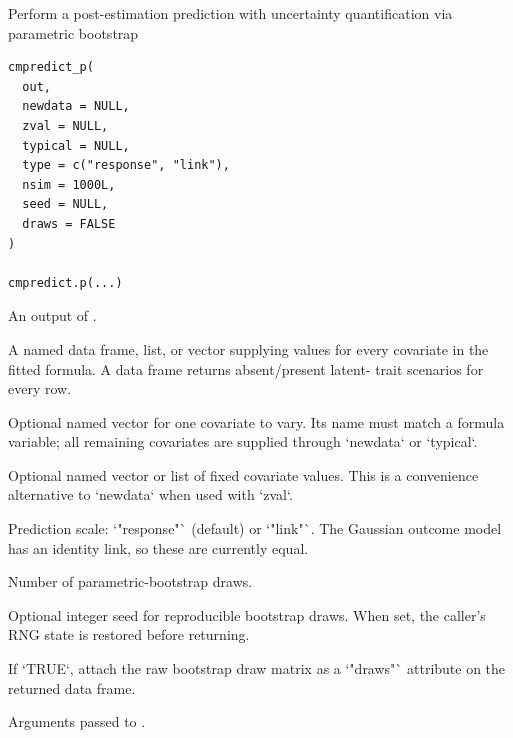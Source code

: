 \documentclass[a4paper]{book}
\begin{document}
%
\begin{Description}
Perform a post-estimation prediction with uncertainty quantification via parametric bootstrap
\end{Description}
%
\begin{Usage}
\begin{verbatim}
cmpredict_p(
  out,
  newdata = NULL,
  zval = NULL,
  typical = NULL,
  type = c("response", "link"),
  nsim = 1000L,
  seed = NULL,
  draws = FALSE
)

cmpredict.p(...)
\end{verbatim}
\end{Usage}
%
\begin{Arguments}
\begin{ldescription}
\item[\code{out}] An output of .

\item[\code{newdata}] A named data frame, list, or vector supplying values for every
covariate in the fitted formula. A data frame returns absent/present latent-
trait scenarios for every row.

\item[\code{zval}] Optional named vector for one covariate to vary. Its name must
match a formula variable; all remaining covariates are supplied through
`newdata` or `typical`.

\item[\code{typical}] Optional named vector or list of fixed covariate values. This
is a convenience alternative to `newdata` when used with `zval`.

\item[\code{type}] Prediction scale: `"response"` (default) or `"link"`. The
Gaussian outcome model has an identity link, so these are currently equal.

\item[\code{nsim}] Number of parametric-bootstrap draws.

\item[\code{seed}] Optional integer seed for reproducible bootstrap draws. When set,
the caller's RNG state is restored before returning.

\item[\code{draws}] If `TRUE`, attach the raw bootstrap draw matrix as a `"draws"`
attribute on the returned data frame.

\item[\code{...}] Arguments passed to .
\end{ldescription}
\end{Arguments}
\end{document}
